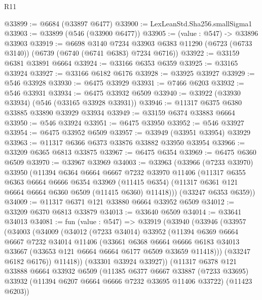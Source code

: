 \begin{lexlean}{R11}
\begin{coremodule}
@33899 := @6684 (@33897 @6477)
@33900 := LexLeanStd.Sha256.smallSigma1
@33903 := @33899 (@546 (@33900 @6477))
@33905 := (value : @547) -> @33896 @33903
@33919 := @6698
    @3140
    @7234
    @33903
    @6383
    @11290
    (@6723 (@6733 @3140))
    (@6739 (@6740 (@6741 @6383) @7234 @6716))
@33922 := @33159 @6381 @33891 @6664
@33924 := @33166 @6353 @6359
@33925 := @33165 @33924
@33927 := @33166 @6182 @6176
@33928 := @33925 @33927
@33929 := @546 @33928
@33930 := @6475 @33929
@33931 := @7466 @6203
@33932 := @546 @33931
@33934 := @6475 @33932 @6509
@33940 := @33922 (@33930 @33934) (@546 (@33165 @33928 @33931))
@33946 := @11317 @6375 @6380 @33885 @33890 @33929 @33934
@33949 := @33159 @6374 @33883 @6664
@33950 := @546 @33924
@33951 := @6475 @33950
@33952 := @546 @33927
@33954 := @6475 @33952 @6509
@33957 := @33949 (@33951 @33954) @33929
@33963 := @11317 @6366 @6373 @33876 @33882 @33950 @33954
@33966 := @33209 @6365 @6813 @33875
@33967 := @6475 @6354
@33969 := @6475 @6360 @6509
@33970 := @33967 @33969
@34003 := @33963
    (@33966
      (@7233 @33970)
      @33950
      (@11394
        @6364
        @6664
        @6667
        @7232
        @33970
        @11406
        (@11317
          @6355
          @6363
          @6664
          @6666
          @6354
          @33969
          (@11415 @6354)
          (@11317 @6361 @121 @6664 @6664 @6360 @6509 (@11415 @6360) @11418)))
      (@33247 @6353 @6359))
@34009 := @11317 @6371 @121 @33880 @6664 @33952 @6509
@34012 := @33209 @6370 @6813 @33879
@34013 := @33640 @6509
@34014 := @33641 @34013
@34081 := fun (value : @547) =>
  @33919
    (@33940
      (@33946
        (@33957
          (@34003
            (@34009
              (@34012
                (@7233 @34014)
                @33952
                (@11394
                  @6369
                  @6664
                  @6667
                  @7232
                  @34014
                  @11406
                  (@33661
                    @6368
                    @6664
                    @6666
                    @6183
                    @34013
                    @33667
                    (@33653 @121 @6664 @6664 @6177 @6509 @33659 @11418)))
                (@33247 @6182 @6176))
              @11418))
          (@33301 @33924 @33927))
        (@11317
          @6378
          @121
          @33888
          @6664
          @33932
          @6509
          (@11385
            @6377
            @6667
            @33887
            (@7233 @33695)
            @33932
            (@11394 @6207 @6664 @6666 @7232 @33695 @11406 @33722)
            (@11423 @6203))

\end{coremodule}
\end{lexlean}
